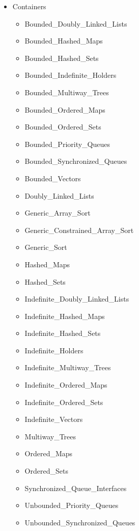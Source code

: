 \documentclass[english]{article}
\begin{document}
\begin{scriptsize}
\begin{multicols*}{5}
\begin{itemize}[leftmargin=0mm]
\begin{itemize}[leftmargin=5mm]
      \item[] Containers
         \begin{itemize}[leftmargin=5mm]
            \item[] Bounded\_Doubly\_Linked\_Lists
            \item[] Bounded\_Hashed\_Maps
            \item[] Bounded\_Hashed\_Sets
            \item[] Bounded\_Indefinite\_Holders
            \item[] Bounded\_Multiway\_Trees
            \item[] Bounded\_Ordered\_Maps
            \item[] Bounded\_Ordered\_Sets
            \item[] Bounded\_Priority\_Queues
            \item[] Bounded\_Synchronized\_Queues
            \item[] Bounded\_Vectors
            \item[] Doubly\_Linked\_Lists
            \item[] Generic\_Array\_Sort
            \item[] Generic\_Constrained\_Array\_Sort
            \item[] Generic\_Sort
            \item[] Hashed\_Maps
            \item[] Hashed\_Sets
            \item[] Indefinite\_Doubly\_Linked\_Lists
            \item[] Indefinite\_Hashed\_Maps
            \item[] Indefinite\_Hashed\_Sets
            \item[] Indefinite\_Holders
            \item[] Indefinite\_Multiway\_Trees
            \item[] Indefinite\_Ordered\_Maps
            \item[] Indefinite\_Ordered\_Sets
            \item[] Indefinite\_Vectors
            \item[] Multiway\_Trees
            \item[] Ordered\_Maps
            \item[] Ordered\_Sets
            \item[] Synchronized\_Queue\_Interfaces
            \item[] Unbounded\_Priority\_Queues
            \item[] Unbounded\_Synchronized\_Queues

\end{itemize}
\end{itemize}
\end{itemize}
\end{multicols*}
\end{scriptsize}
\end{document}
